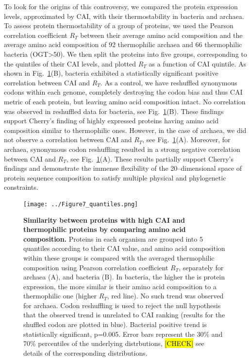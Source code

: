 \documentclass[10pt,letterpaper]{article}
\begin{document}
To look for the origins of this controversy, we compared the protein expression levels, approximated by CAI, with their thermostability in bacteria and archaea. To assess protein thermostability of a group of proteins, we used the Pearson correlation coefficient $R_T$ between their average amino acid composition and the average amino acid composition of 92 thermophilic archaea and 66 thermophilic bacteria (OGT\textgreater50\textcelsius). We then split the proteins into five groups, corresponding to the quintiles of their CAI levels, and plotted $R_T$ as a function of CAI quintile. As shown in Fig.~\ref{fig:fig7}(B), bacteria exhibited a statistically significant positive correlation between CAI and $R_T$. As a control, we have reshuffled synonymous codons within each genome, completely destroying the codon bias and thus CAI metric of each protein, but leaving amino acid composition intact. No correlation was observed in reshuffled data for bacteria, see Fig.~\ref{fig:fig7}(B). These findings support Cherry's finding of highly expressed proteins having amino acid composition similar to thermophilic ones. However, in the case of archaea, we did not observe a correlation between CAI and $R_T$, see Fig.~\ref{fig:fig7}(A). Moreover, for archaea, synonymous codon reshuffling resulted in a strong negative correlation between CAI and $R_T$, see Fig.~\ref{fig:fig7}(A). These results partially support Cherry's findings and demonstrate the immense flexibility of the 20--dimensional space of protein sequence composition to satisfy multiple physical and phylogenetic constraints.

\begin{figure}[h!]
\texttt{[image: ../Figure7\_quantiles.png]}
\caption{
{\bf Similarity between proteins with high CAI and thermophilic proteins by comparing amino acid composition.}
Proteins in each organism are grouped into 5 quantiles according to their CAI value, and amino acid composition within these groups is compared with the averaged thermophilic composition using Pearson correlation coefficient $R_T$, separately for archaea (A), and bacteria (B). In bacteria, the higher the is protein expression, the more similar is their amino acid composition to a thermophilic one (higher $R_T$, red line). No such trend was observed for archaea. Codon reshuffling is used to reject the null hypothesis that the observed trend is unrelated to CAI ranking (results for the shuffled codon are plotted in blue). Bacterial positive trend is statistically significant, p=0.005. Error bars represent the 30\% and 70\% percentiles of the underlying distrbutions, \hl{[CHECK]} see~ details of the corresponding distributions.
}
\label{fig:fig7}
\end{figure}
\end{document}
